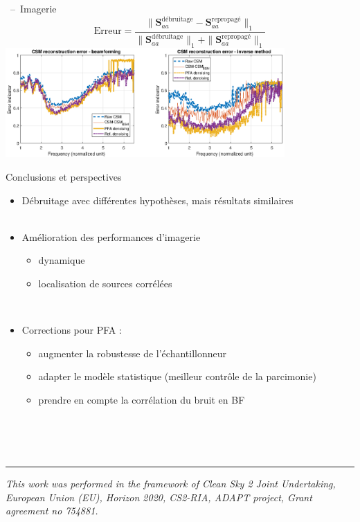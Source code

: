 \documentclass[10pt,xcolor=x11names,compress, show notes]{beamer}%
\begin{document}
\begin{frame}{\insertsectionhead~--~Imagerie}
	\centering
	\small
	\begin{equation*}
        		\text{Erreur} = \frac{\|\bm{S}_{aa}^{\text{débruitage}}-\bm{S}_{aa}^{\text{repropagé}}\|_1}{\|\bm{S}_{aa}^{\text{débruitage}}\|_1+\|\bm{S}_{aa}^{\text{repropagé}}\|_1}
	\end{equation*}
	\vfill
	\includegraphics[width=0.8\textwidth]{airbus/erreur.eps}
\end{frame}

\begin{frame}{Conclusions et perspectives}
\begin{itemize}
	\item Débruitage avec différentes hypothèses, mais résultats similaires\\~\\
        \item Amélioration des performances d'imagerie
        \begin{itemize}
       		 \item dynamique
        		\item localisation de sources corrélées
	\end{itemize}~\\
	
	\item Corrections pour PFA :
	\begin{itemize}
        		\item augmenter la robustesse de l'échantillonneur
        		\item adapter le modèle statistique (meilleur contrôle de la parcimonie)
        		\item prendre en compte la corrélation du bruit en BF
	\end{itemize}
\end{itemize}

~\\~\\~\\
\vfill
\begin{center}
	\noindent\rule{\textwidth}{0.4pt}
	\scriptsize \itshape{
	This work was performed in the framework of Clean Sky 2 Joint Undertaking, European Union (EU), Horizon 2020, CS2-RIA, ADAPT project, Grant agreement no 754881.}\\
\end{center}
\end{frame}
\end{document}
